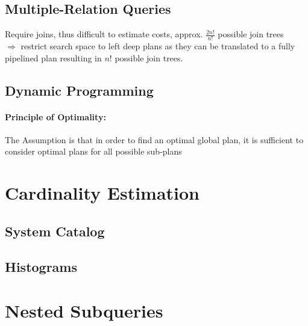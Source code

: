 \subsection{Multiple-Relation Queries}
Require joins, thus difficult to estimate costs, approx. $\frac{2n!}{n!}$ possible join trees \\
$\Rightarrow$ restrict search space to left deep plans as they can be translated to a fully pipelined plan resulting in $n!$ possible join trees. \\

\subsection{Dynamic Programming}
\paragraph{Principle of Optimality:} The Assumption is that in order to find an optimal global plan, it is sufficient to consider optimal plans for all possible sub-plans \\

\section{Cardinality Estimation}


\subsection{System Catalog}


\subsection{Histograms}

\section{Nested Subqueries}

